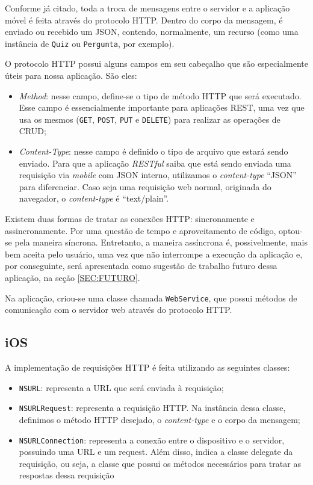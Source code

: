     Conforme já citado, toda a troca de mensagens entre o servidor e a aplicação móvel é feita através do protocolo \ac{HTTP}. Dentro do corpo da mensagem, é enviado ou recebido um \ac{JSON}, contendo, normalmente, um recurso (como uma instância de \texttt{Quiz} ou \texttt{Pergunta}, por exemplo).
    
	O protocolo \ac{HTTP} possui alguns campos em seu cabeçalho que são especialmente úteis para nossa aplicação. São eles:
\begin{itemize}
\item \emph{Method}: nesse campo, define-se o tipo de método \ac{HTTP} que será executado. Esse campo é essencialmente importante para aplicações \ac{REST}, uma vez que usa os mesmos (\texttt{GET}, \texttt{POST}, \texttt{PUT} e \texttt{DELETE}) para realizar as operações de \ac{CRUD};
\item \emph{Content-Type}: nesse campo é definido o tipo de arquivo que estará sendo enviado. Para que a aplicação \emph{RESTful} saiba que está sendo enviada uma requisição via \emph{mobile} com \ac{JSON} interno, utilizamos o \emph{content-type} ``JSON'' para diferenciar. Caso seja uma requisição web normal, originada do navegador, o \emph{content-type} é ``text/plain''.
\end{itemize}     
   
    Existem duas formas de tratar as conexões \ac{HTTP}: sincronamente e assincronamente. Por uma questão de tempo e aproveitamento de código, optou-se pela maneira síncrona. Entretanto, a maneira assíncrona é, possivelmente, mais bem aceita pelo usuário, uma vez que não interrompe a execução da aplicação e, por conseguinte, será apresentada como sugestão de trabalho futuro dessa aplicação, na seção \ref{SEC:FUTURO}.
    
	Na aplicação, criou-se uma classe chamada \texttt{WebService}, que possui métodos de comunicação com o servidor web através do protocolo \ac{HTTP}.
     
    \subsection{iOS}
     
            A implementação de requisições \ac{HTTP} é feita utilizando as seguintes classes:
\begin{itemize}
\item \texttt{NSURL}: representa a \ac{URL} que será enviada à requisição;
\item \texttt{NSURLRequest}: representa a requisição \ac{HTTP}. Na instância dessa classe, definimos o método \ac{HTTP} desejado, o \emph{content-type} e o corpo da mensagem;
\item \texttt{NSURLConnection}: representa a conexão entre o dispositivo e o servidor, possuindo uma \ac{URL} e um request. Além disso, indica a classe delegate da requisição, ou seja, a classe que possui os métodos necessários para tratar as respostas dessa requisição
\end{itemize}
     
